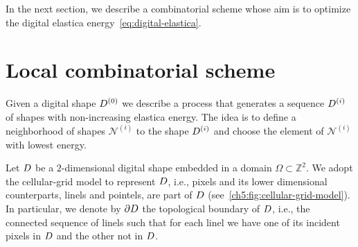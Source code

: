  In the next section, we describe a combinatorial scheme whose aim is to optimize the digital elastica energy~\cref{eq:digital-elastica}.

\section{Local combinatorial scheme}
\label{ch5:sec:local-combinatorial-scheme}

Given a digital shape $D^{(0)}$ we describe a process that generates a
sequence $D^{(i)}$ of shapes with non-increasing elastica energy. The
idea is to define a neighborhood of shapes $\mathcal{N}^{(i)}$ to the
shape $D^{(i)}$ and choose the element of $\mathcal{N}^{(i)}$ with
lowest energy.  

Let $D$ be a $2$-dimensional digital shape embedded in a domain $\Omega \subset \mathbb{Z}^2$. We adopt the cellular-grid model to represent $D$, i.e., pixels and its lower dimensional counterparts, linels and pointels, are part of $D$ (see~\cref{ch5:fig:cellular-grid-model}). In particular, we denote by $\partial D$ the topological boundary of $D$, i.e., the connected sequence of linels such that for each linel we have one of its incident pixels in $D$ and the other not in $D$.

